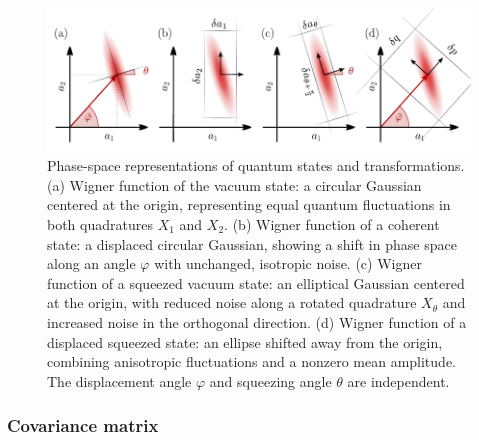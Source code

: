 \begin{figure}
\centering
\includegraphics[width=\textwidth]{./chap2/fig/quantum_quadraturesBis.pdf}
\caption{Phase-space representations of quantum states and transformations.
(a) Wigner function of the vacuum state: a circular Gaussian centered at the origin, representing equal quantum fluctuations in both quadratures $X_1$ and $X_2$.
(b) Wigner function of a coherent state: a displaced circular Gaussian, showing a shift in phase space along an angle $\varphi$ with unchanged, isotropic noise.
(c) Wigner function of a squeezed vacuum state: an elliptical Gaussian centered at the origin, with reduced noise along a rotated quadrature $X_\theta$ and increased noise in the orthogonal direction.
(d) Wigner function of a displaced squeezed state: an ellipse shifted away from the origin, combining anisotropic fluctuations and a nonzero mean amplitude. The displacement angle $\varphi$ and squeezing angle $\theta$ are independent.} 
\end{figure}
\subsubsection*{Covariance matrix}

